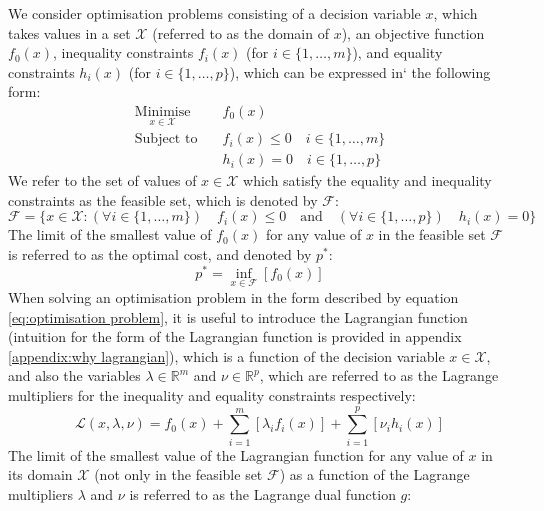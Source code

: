 We consider optimisation problems consisting of a decision variable $x$, which takes values in a set $\mathcal{X}$ (referred to as the domain of $x$), an objective function $f_0(x)$, inequality constraints $f_i(x)$ (for $i\in\{1, \hdots, m\}$), and equality constraints $h_i(x)$ (for $i\in\{1, \hdots, p\}$), which can be expressed in` the following form:
\begin{equation}
\begin{aligned}
    \underset{x \in \mathcal{X}}{\text{Minimise}} \quad & f_0(x) \\
    \text{Subject to} \quad & f_i(x) \le 0 \quad i\in\{1, \hdots, m\} \\
    & h_i(x) = 0 \quad i\in\{1, \hdots, p\}
\end{aligned} \label{eq:optimisation problem}
\end{equation}
We refer to the set of values of $x\in\mathcal{X}$ which satisfy the equality and inequality constraints as the feasible set, which is denoted by $\mathcal{F}$:
\begin{equation}
    \mathcal{F} = \{ x\in\mathcal{X}: (\forall i\in\{1, \hdots, m\}) \quad f_i(x) \le 0 \quad \text{and} \quad (\forall i\in\{1, \hdots, p\}) \quad h_i(x) = 0 \}
\end{equation}
The limit of the smallest value of $f_0(x)$ for any value of $x$ in the feasible set $\mathcal{F}$ is referred to as the optimal cost, and denoted by $p^*$:
\begin{equation}
    p^* = \underset{x\in\mathcal{F}}{\inf}\left[f_0(x)\right]
\end{equation}
When solving an optimisation problem in the form described by equation \ref{eq:optimisation problem}, it is useful to introduce the Lagrangian function \cite{boyd2004convex} (intuition for the form of the Lagrangian function is provided in appendix \ref{appendix:why lagrangian}), which is a function of the decision variable $x\in\mathcal{X}$, and also the variables $\lambda \in \mathbb{R}^m $ and $\nu\in\mathbb{R}^p$, which are referred to as the Lagrange multipliers for the inequality and equality constraints respectively:
\begin{equation}
    \mathcal{L}(x, \lambda, \nu) = f_0(x) + \sum_{i=1}^{m}[\lambda_i f_i(x)] + \sum_{i=1}^{p}[\nu_i h_i(x)] \label{eq:Lagrangian}
\end{equation}
The limit of the smallest value of the Lagrangian function for any value of $x$ in its domain $\mathcal{X}$ (not only in the feasible set $\mathcal{F}$) as a function of the Lagrange multipliers $\lambda$ and $\nu$ is referred to as the Lagrange dual function $g$:
